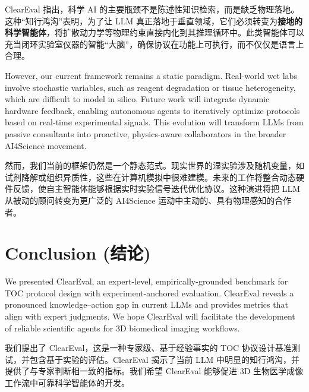 \documentclass[runningheads]{llncs}
\begin{document}
ClearEval 指出，科学 AI 的主要瓶颈不是陈述性知识检索，而是缺乏物理落地。这种“知行鸿沟”表明，为了让 LLM 真正落地于垂直领域，它们必须转变为\textbf{接地的科学智能体}，将扩散动力学等物理约束直接内化到其推理循环中。此类智能体可以充当闭环实验室仪器的智能“大脑”，确保协议在功能上可执行，而不仅仅是语言上合理。

However, our current framework remains a static paradigm. Real-world wet labs involve stochastic variables, such as reagent degradation or tissue heterogeneity, which are difficult to model in silico. Future work will integrate dynamic hardware feedback, enabling autonomous agents to iteratively optimize protocols based on real-time experimental signals. This evolution will transform LLMs from passive consultants into proactive, physics-aware collaborators in the broader AI4Science movement.

然而，我们当前的框架仍然是一个静态范式。现实世界的湿实验涉及随机变量，如试剂降解或组织异质性，这些在计算机模拟中很难建模。未来的工作将整合动态硬件反馈，使自主智能体能够根据实时实验信号迭代优化协议。这种演进将把 LLM 从被动的顾问转变为更广泛的 AI4Science 运动中主动的、具有物理感知的合作者。

\section{Conclusion (结论)}

We presented ClearEval, an expert-level, empirically-grounded benchmark for TOC protocol design with experiment-anchored evaluation.
ClearEval reveals a pronounced knowledge--action gap in current LLMs and provides metrics that align with expert judgments.
We hope ClearEval will facilitate the development of reliable scientific agents for 3D biomedical imaging workflows.

我们提出了 ClearEval，这是一种专家级、基于经验事实的 TOC 协议设计基准测试，并包含基于实验的评估。ClearEval 揭示了当前 LLM 中明显的知行鸿沟，并提供了与专家判断相一致的指标。我们希望 ClearEval 能够促进 3D 生物医学成像工作流中可靠科学智能体的开发。



\end{document}
